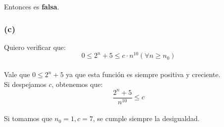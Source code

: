 \documentclass[12 pt]{article}
\begin{document}
            \begin{center}
            \end{center}

            Entonces es \textbf{falsa}.

        \subsubsection*{(c)}
            Quiero verificar que:
            \[0 \leq 2^{n}+5 \leq c \cdot n^{10} (\forall n \geq n_{0})\]
            \\
            Vale que \(0 \leq 2^{n}+5\) ya que esta función es siempre positiva y creciente.
            \\
            Si despejamos $c$, obtenemos que:
            \[\frac{2^{n}+5}{n^{10}} \leq c\]
            \\
            Si tomamos que \(n_{0} = 1, c = 7\), se cumple siempre la desigualdad.
\end{document}
